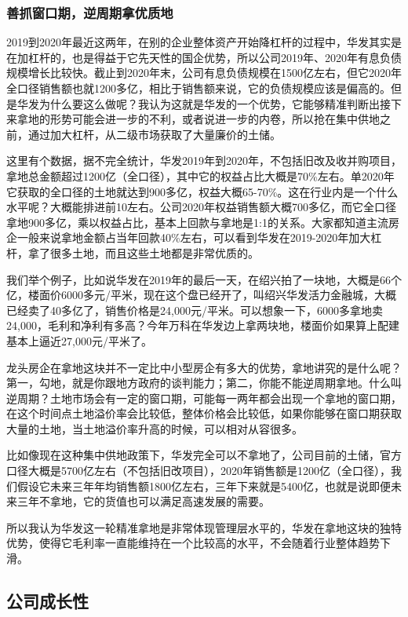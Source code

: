 \documentclass[a4paper,12pt,lang=cn,fontset = windows]{elegantpaper} %
\begin{document}
\subsubsection{善抓窗口期，逆周期拿优质地}

2019到2020年最近这两年，在别的企业整体资产开始降杠杆的过程中，华发其实是在加杠杆的，也是得益于它先天性的国企优势，所以公司2019年、2020年有息负债规模增长比较快。截止到2020年末，公司有息负债规模在1500亿左右，但它2020年全口径销售额也就1200多亿，相比于销售额来说，它的负债规模应该是偏高的。但是华发为什么要这么做呢？我认为这就是华发的一个优势，它能够精准判断出接下来拿地的形势可能会进一步的不利，或者说进一步的内卷，所以抢在集中供地之前，通过加大杠杆，从二级市场获取了大量廉价的土储。

这里有个数据，据不完全统计，华发2019年到2020年，不包括旧改及收并购项目，拿地总金额超过1200亿（全口径），其中它的权益占比大概是70\%左右。单2020年它获取的全口径的土地就达到900多亿，权益大概65-70\%。这在行业内是一个什么水平呢？大概能排进前10左右。公司2020年权益销售额大概700多亿，而它全口径拿地900多亿，乘以权益占比，基本上回款与拿地是1:1的关系。大家都知道主流房企一般来说拿地金额占当年回款40\%左右，可以看到华发在2019-2020年加大杠杆，拿了很多土地，而且这些土地都是非常优质的。

我们举个例子，比如说华发在2019年的最后一天，在绍兴拍了一块地，大概是66个亿，楼面价6000多元/平米，现在这个盘已经开了，叫绍兴华发活力金融城，大概已经卖了40多亿了，销售价格是24,000元/平米。可以想象一下，6000多拿地卖24,000，毛利和净利有多高？今年万科在华发边上拿两块地，楼面价如果算上配建基本上逼近27,000元/平米了。

龙头房企在拿地这块并不一定比中小型房企有多大的优势，拿地讲究的是什么呢？第一，勾地，就是你跟地方政府的谈判能力；第二，你能不能逆周期拿地。什么叫逆周期？土地市场会有一定的窗口期，可能每一两年都会出现一个拿地的窗口期，在这个时间点土地溢价率会比较低，整体价格会比较低，如果你能够在窗口期获取大量的土地，当土地溢价率升高的时候，可以相对从容很多。

比如像现在这种集中供地政策下，华发完全可以不拿地了，公司目前的土储，官方口径大概是5700亿左右（不包括旧改项目），2020年销售额是1200亿（全口径），我们假设它未来三年年均销售额1800亿左右，三年下来就是5400亿，也就是说即便未来三年不拿地，它的货值也可以满足高速发展的需要。

所以我认为华发这一轮精准拿地是非常体现管理层水平的，华发在拿地这块的独特优势，使得它毛利率一直能维持在一个比较高的水平，不会随着行业整体趋势下滑。



\subsection{公司成长性}
\end{document}
